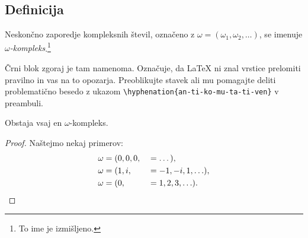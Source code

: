 \documentclass[isrm2, tisk]{fmfdelo}
\begin{document}
    \subsection{Definicija}
    \begin{definicija}
        Neskončno zaporedje kompleksnih števil, označeno z $\omega = (\omega_1, \omega_2, \ldots)$,
        se imenuje \emph{$\omega$-kompleks}.\footnote{To ime je izmišljeno.}

        Črni blok zgoraj je tam namenoma. Označuje, da \LaTeX{} ni znal vrstice prelomiti pravilno
        in vas na to opozarja. Preoblikujte stavek ali mu pomagajte deliti problematično besedo z
        ukazom \verb|\hyphenation{an-ti-ko-mu-ta-ti-ven}| v preambuli.
    \end{definicija}
    \begin{trditev}
        \label{trd:obstoj-omega}
        Obstaja vsaj en $\omega$-kompleks.
    \end{trditev}
    \begin{proof}
        Naštejmo nekaj primerov:
        \begin{align}
            \omega &= (0, 0, 0,& &= \dots), \label{eq:zero-kompleks} \\
            \omega &= (1, i, & &=-1, -i, 1, \ldots), \nonumber \\
            \omega &= (0,& &= 1, 2, 3, \ldots). \nonumber \qedhere  %
        \end{align}
    \end{proof}
\end{document}

